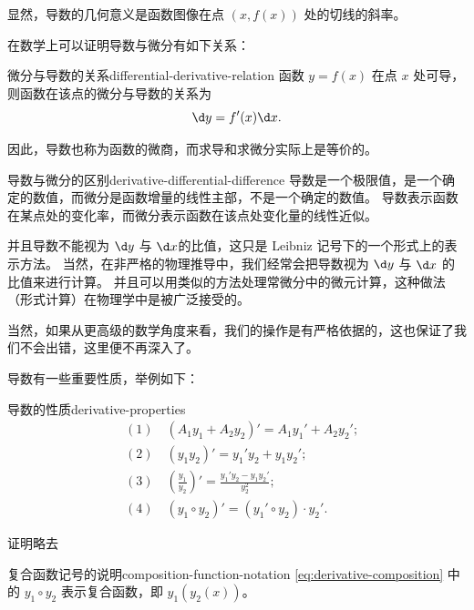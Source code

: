 显然，导数的几何意义是函数图像在点 $ (x, f(x)) $ 处的切线的斜率。
\bigskip

在数学上可以证明导数与微分有如下关系：
\begin{definition}{微分与导数的关系}{differential-derivative-relation}
    函数 $ y = f(x) $ 在点 $ x $ 处可导，则函数在该点的微分与导数的关系为
    \begin{equation}
        \d y = f'(x) \d x.
    \end{equation}

    因此，导数也称为函数的微商，而求导和求微分实际上是等价的。

\end{definition}

\begin{note}{导数与微分的区别}{derivative-differential-difference}
    导数是一个极限值，是一个确定的数值，而微分是函数增量的线性主部，不是一个确定的数值。
    导数表示函数在某点处的变化率，而微分表示函数在该点处变化量的线性近似。
    \medskip

    并且导数不能视为 $ \d y $ 与 $ \d x $的比值，这只是 Leibniz 记号下的一个形式上的表示方法。
    当然，在非严格的物理推导中，我们经常会把导数视为 $ \d y $ 与 $ \d x $ 的比值来进行计算。
    并且可以用类似的方法处理常微分中的微元计算，这种做法（形式计算）在物理学中是被广泛接受的。
    \medskip

    当然，如果从更高级的数学角度来看，我们的操作是有严格依据的，这也保证了我们不会出错，这里便不再深入了。

\end{note}

导数有一些重要性质，举例如下：
\begin{physlist}{导数的性质}{derivative-properties}
    \begin{align}
         & (1)\quad (A_1 y_1 + A_2 y_2)' = A_1 y_1' + A_2 y_2' ;                                      \\
         & (2)\quad (y_1 y_2)' = y_1' y_2 + y_1 y_2' ;                                                \\
         & (3)\quad \left( \frac{y_1}{y_2} \right)' = \frac{y_1' y_2 - y_1 y_2'}{y_2^2} ;             \\
         & (4)\quad (y_1 \circ y_2)' = (y_1' \circ y_2) \cdot y_2' .\label{eq:derivative-composition}
    \end{align}

\end{physlist}
证明略去

\begin{note}{复合函数记号的说明}{composition-function-notation}
    \cref{eq:derivative-composition} 中的 $ y_1 \circ y_2 $ 表示复合函数，即 $ y_1 (y_2 (x)) $。
\end{note}


